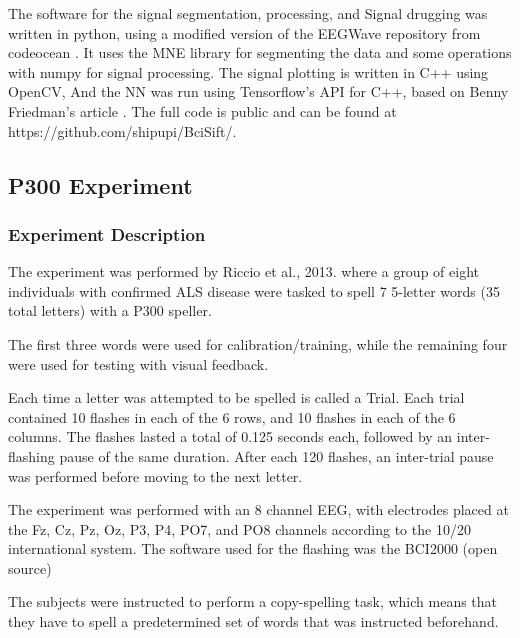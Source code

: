 \documentclass[conference]{IEEEtran}
\begin{document}
The software for the signal segmentation, processing, and Signal drugging was written in python, using a modified version of the EEGWave repository from codeocean \cite{Ramele2018EEGWA}. It uses the MNE library for segmenting the data and some operations with numpy for signal processing.
The signal plotting is written in C++ using OpenCV, And the NN was run using Tensorflow's API for C++, based on Benny Friedman's article \cite{BennyCNN}. The full code is public and can be found at https://github.com/shipupi/BciSift/.


\subsection{P300 Experiment}
\subsubsection{Experiment Description}
The experiment was performed by Riccio et al., 2013\cite{riccio2013}. where a group of eight individuals with confirmed ALS disease were tasked to spell 7 5-letter words (35 total letters) with a P300 speller.

The first three words were used for calibration/training, while the remaining four were used for testing with visual feedback.

Each time a letter was attempted to be spelled is called a Trial. Each trial contained 10 flashes in each of the 6 rows, and 10 flashes in each of the 6 columns. The flashes lasted a total of 0.125 seconds each, followed by an inter-flashing pause of the same duration. After each 120 flashes, an inter-trial pause was performed before moving to the next letter.

The experiment was performed with an 8 channel EEG, with electrodes placed at the Fz, Cz, Pz, Oz, P3, P4, PO7, and PO8 channels according to the 10/20 international system. The software used for the flashing was the BCI2000 (open source) \cite{schalk2004}

The subjects were instructed to perform a copy-spelling task, which means that they have to spell a predetermined set of words that was instructed beforehand.
\end{document}

